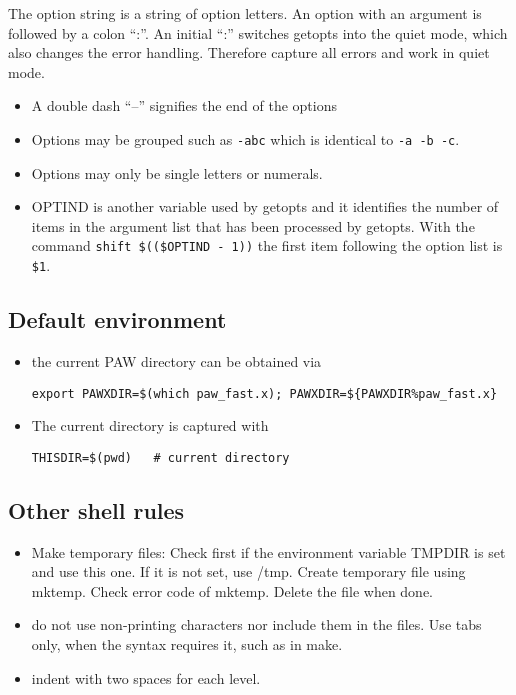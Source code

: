 \documentclass[11pt,a4paper]{report}
\begin{document}
The option string is a string of option letters. An option with an
argument is followed by a colon ``:''. An initial ``:'' switches
getopts into the quiet mode, which also changes the error
handling. Therefore capture all errors and work in quiet mode.

\begin{itemize}
\item A double dash ``--'' signifies the end of the options
%
\item Options may be grouped such as \verb|-abc| which is identical to
\verb|-a -b -c|.
%
\item Options may only be single letters or numerals.
%
\item OPTIND is another variable used by getopts and it identifies the
  number of items in the argument list that has been processed by
  getopts. With the command \verb|shift $(($OPTIND - 1))| the first
  item following the option list is \verb|$1|.
\end{itemize}

\subsection{Default environment}
\begin{itemize}
\item the current PAW directory can be obtained via
\begin{verbatim}
export PAWXDIR=$(which paw_fast.x); PAWXDIR=${PAWXDIR%paw_fast.x}
\end{verbatim}
%
\item The current directory is captured with
\begin{verbatim}
THISDIR=$(pwd)   # current directory
\end{verbatim}
\end{itemize}

\subsection{Other shell rules}
\begin{itemize}
\item Make temporary files:  Check first if the environment variable
  TMPDIR is set and use this one. If it is not set, use /tmp.  Create
  temporary file using mktemp. Check error code of mktemp. Delete the
  file when done.
%
\item do not use non-printing characters nor include them in the
  files. Use tabs only, when the syntax requires it, such as in make.
%
\item indent with two spaces for each level.

\end{itemize}
\end{document}
